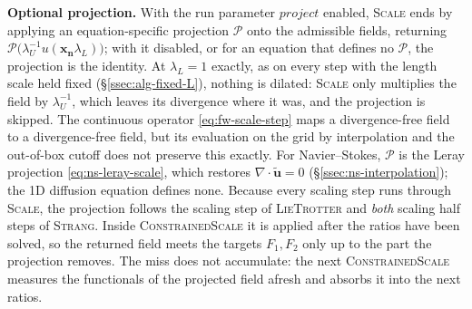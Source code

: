 \documentclass{article}
\begin{document}
\textbf{Optional projection.} With the run parameter $\mathit{project}$
enabled, \textsc{Scale} ends by applying an equation-specific projection
$\mathcal{P}$ onto the admissible fields, returning
$\mathcal{P}\bigl(\lambda_U^{-1} u(\mathbf{x_n} \lambda_L)\bigr)$; with it disabled, or
for an equation that defines no $\mathcal{P}$, the projection is the identity.
At $\lambda_L = 1$ exactly, as on every step with the length scale held
fixed (\S\ref{ssec:alg-fixed-L}), nothing is dilated: \textsc{Scale} only
multiplies the field by $\lambda_U^{-1}$, which leaves its divergence where
it was, and the projection is skipped. The
continuous operator \eqref{eq:fw-scale-step} maps a divergence-free field to a
divergence-free field, but its evaluation on the grid by interpolation and
the out-of-box cutoff does not preserve this exactly. For Navier--Stokes,
$\mathcal{P}$ is the Leray projection \eqref{eq:ns-leray-scale}, which restores
$\nabla \cdot \tilde{\mathbf{u}} = 0$ (\S\ref{ssec:ns-interpolation}); the 1D
diffusion equation defines none. Because every scaling step runs through
\textsc{Scale}, the projection follows the scaling step of \textsc{LieTrotter}
and \emph{both} scaling half steps of \textsc{Strang}. Inside
\textsc{ConstrainedScale} it is applied after the ratios have been solved, so
the returned field meets the targets $F_1, F_2$ only up to the part the
projection removes. The miss does not accumulate: the next
\textsc{ConstrainedScale} measures the functionals of the projected field
afresh and absorbs it into the next ratios.
\end{document}
